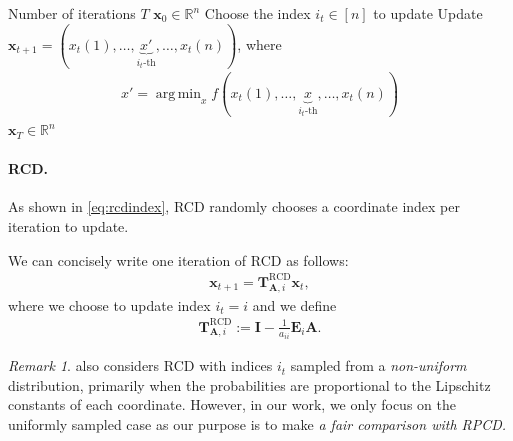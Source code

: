 \documentclass{article}
\theoremstyle{plain}
\theoremstyle{definition}
\theoremstyle{remark}
\newtheorem*{remark*}{Remark} %
\newcommand{\RCD}{\text{RCD}} %
\def\vx{{\bm{x}}}
\def\mA{{\bm{A}}}
\def\mD{{\bm{D}}}
\def\mE{{\bm{E}}}
\def\mI{{\bm{I}}}
\def\mT{{\bm{T}}}
\newcommand{\E}{\mathbb{E}}
\newcommand{\R}{\mathbb{R}}
\DeclareMathOperator*{\argmin}{arg\,min}
\DeclareMathOperator{\diag}{diag}
\begin{document}
\begin{algorithm}[tb] %
    \caption{Coordinate Descent (CD) }
    \label{alg:cd}
    \begin{algorithmic}
         Number of iterations $T$
         $\vx_{0} \in \R^{n}$
            \STATE Choose the index $i_t \in [n]$ to update
            \STATE Update $\vx_{t+1} = (x_t(1), \dots, \underbrace{x'}_{i_t\text{-th}}, \dots, x_t(n))$, where \vspace{-10pt}
            \begin{align*}
                x' = \argmin_{x} f (x_{t} (1), \dots, \underbrace{x}_{i_t\text{-th}}, \dots, x_{t} (n))
            \end{align*} \vspace{-20pt}
        \ENDFOR
         $\vx_{T} \in \R^{n}$
    \end{algorithmic}
\end{algorithm}

\paragraph{RCD.} As shown in \cref{eq:rcdindex}, RCD randomly chooses a coordinate index per iteration to update.

We can concisely write one iteration of RCD as follows:
\begin{align*}
    \vx_{t+1} = \mT_{\mA, i}^{\RCD} \vx_t,
\end{align*}
where we choose to update index $i_t = i$ and we define
\begin{align}
    \mT_{\mA, i}^{\RCD} := \mI - \frac{1}{a_{ii}} \mE_{i} \mA. \label{eq:rcdmatrix}
\end{align}

\begin{remark*}
    \citet{nesterov12} also considers RCD with indices $i_t$ sampled from a \emph{non-uniform} distribution, primarily when the probabilities are proportional to the Lipschitz constants of each coordinate.
    However, in our work, we only focus on the uniformly sampled case as our purpose is to make \emph{a fair comparison with RPCD.}
\end{remark*}
\end{document}
